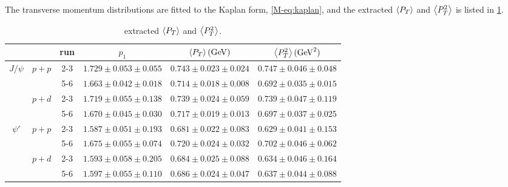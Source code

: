 \documentclass[../main.tex]{subfiles}
\begin{document}
The transverse momentum distributions are fitted to the Kaplan form, \cref{M-eq:kaplan}, and the extracted
$\expval{P_T}$ and $\expval{P^2_T}$ is listed in \cref{tab:kaplan_result}.
\begin{table}[h!]
	\centering
	\caption{extracted $\expval{P_T}$ and $\expval{P^2_T}$.}
	\label{tab:kaplan_result}
	\begin{tabular}{cc|c|c|c|c}
		\hline
		                                               &                        & run & $p_1$                   & $\expval{P_T} (\unit{\GeV})$          & $\expval{P^2_T} (\unit{\square\GeV})$        \\ \hline
		\multicolumn{1}{c|}{\multirow{4}{*}{$J/\psi$}} & \multirow{2}{*}{$p+p$} & 2-3 & $1.729\pm0.053\pm0.055$ & $0.743\pm0.023\pm0.024$ & $0.747\pm0.046\pm0.048$ \\ \cline{3-6}
		\multicolumn{1}{c|}{}                          &                        & 5-6 & $1.663\pm0.042\pm0.018$ & $0.714\pm0.018\pm0.008$ & $0.692\pm0.035\pm0.015$ \\ \cline{2-6}
		\multicolumn{1}{c|}{}                          & \multirow{2}{*}{$p+d$} & 2-3 & $1.719\pm0.055\pm0.138$ & $0.739\pm0.024\pm0.059$ & $0.739\pm0.047\pm0.119$ \\ \cline{3-6}
		\multicolumn{1}{c|}{}                          &                        & 5-6 & $1.670\pm0.045\pm0.030$ & $0.717\pm0.019\pm0.013$ & $0.697\pm0.037\pm0.025$ \\ \hline
		\multicolumn{1}{c|}{\multirow{4}{*}{$\psi'$}}  & \multirow{2}{*}{$p+p$} & 2-3 & $1.587\pm0.051\pm0.193$ & $0.681\pm0.022\pm0.083$ & $0.629\pm0.041\pm0.153$ \\ \cline{3-6}
		\multicolumn{1}{c|}{}                          &                        & 5-6 & $1.675\pm0.055\pm0.074$ & $0.720\pm0.024\pm0.032$ & $0.702\pm0.046\pm0.062$ \\ \cline{2-6}
		\multicolumn{1}{c|}{}                          & \multirow{2}{*}{$p+d$} & 2-3 & $1.593\pm0.058\pm0.205$ & $0.684\pm0.025\pm0.088$ & $0.634\pm0.046\pm0.164$ \\ \cline{3-6}
		\multicolumn{1}{c|}{}                          &                        & 5-6 & $1.597\pm0.055\pm0.110$ & $0.686\pm0.024\pm0.047$ & $0.637\pm0.044\pm0.088$ \\ \hline
	\end{tabular}
\end{table}
\end{document}
